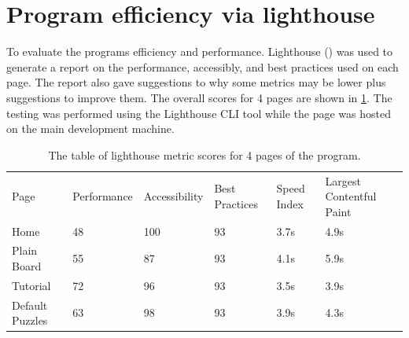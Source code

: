 \documentclass{l4proj}
\begin{document}
\begin{itemize}
\end{itemize}

\section{Program efficiency via lighthouse}
\label{section:efficiency}
To evaluate the programs efficiency and performance. Lighthouse (\cite{noauthor_lighthouse_nodate}) was used to generate a report on the performance, accessibly, and best practices used on each page. The report also gave suggestions to why some metrics may be lower plus suggestions to improve them. The overall scores for 4 pages are shown in \ref{tab:lighthouse}. The testing was performed using the Lighthouse CLI tool while the page was hosted on the main development machine. 

\begin{table}[]
    \caption{The table of lighthouse metric scores for 4 pages of the program.}\label{tab:lighthouse}
    \begin{tabular}{llllll}
        Page            & Performance & Accessibility & Best Practices & Speed Index & Largest Contentful Paint \\
        Home            & 48          & 100           & 93             & 3.7s        & 4.9s                     \\
        Plain Board     & 55          & 87            & 93             & 4.1s        & 5.9s                     \\
        Tutorial        & 72          & 96            & 93             & 3.5s        & 3.9s                     \\
        Default Puzzles & 63          & 98            & 93             & 3.9s        & 4.3s                    
    \end{tabular}
\end{table}
\end{document}
